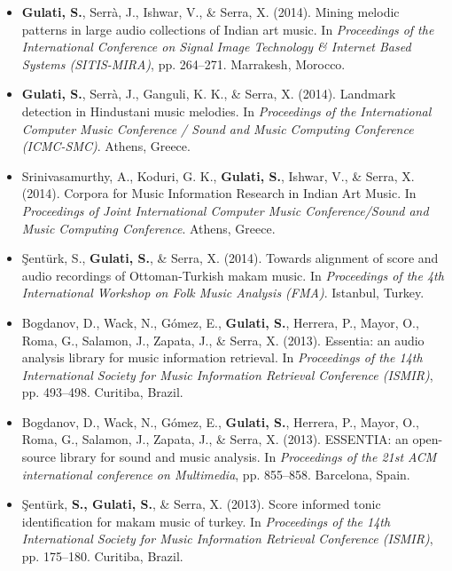 \begin{itemize}[leftmargin=*]
	\item \textbf{Gulati, S.},  Serr{\`a}, J., Ishwar, V., \& Serra, X. (2014). Mining melodic patterns in large audio collections of Indian art music. In \textit{Proceedings of the International Conference on Signal Image Technology \& Internet Based Systems (SITIS-MIRA)}, pp. 264–271. Marrakesh, Morocco.
	\item \textbf{Gulati, S.}, Serr{\`a}, J., Ganguli, K. K., \& Serra, X. (2014). Landmark detection in Hindustani music melodies. In \textit{Proceedings of the International Computer Music Conference / Sound and Music Computing Conference (ICMC-SMC)}. Athens, Greece. 
	\item Srinivasamurthy, A., Koduri, G. K., \textbf{Gulati, S.}, Ishwar, V., \& Serra, X. (2014). Corpora for Music Information Research in Indian Art Music. In \textit{Proceedings of Joint International Computer Music Conference/Sound and Music Computing Conference}. Athens, Greece. 
	\item \c{S}ent{\"u}rk, S., \textbf{Gulati, S.}, \& Serra, X. (2014). Towards alignment of score and audio recordings of Ottoman-Turkish makam music. In \textit{Proceedings of the 4th International Workshop on Folk Music Analysis (FMA)}. Istanbul, Turkey. 
	\item Bogdanov, D., Wack, N., G{\'o}mez, E., \textbf{Gulati, S.}, Herrera, P., Mayor, O., Roma, G., Salamon, J., Zapata, J., \& Serra, X. (2013). Essentia: an audio analysis library for music information retrieval. In \textit{Proceedings of the 14th International Society for Music Information Retrieval Conference (ISMIR)}, pp. 493–498. Curitiba, Brazil.
	\item Bogdanov, D., Wack, N., G{\'o}mez, E., \textbf{Gulati, S.}, Herrera, P., Mayor, O., Roma, G., Salamon, J., Zapata, J., \& Serra, X. (2013). ESSENTIA: an open-source library for sound and music analysis. In \textit{Proceedings of the 21st ACM international conference on Multimedia}, pp. 855–858. Barcelona, Spain.
	\item \c{S}ent{\"u}rk, \textbf{S., Gulati, S.}, \& Serra, X. (2013). Score informed tonic identification for makam music of turkey. In \textit{Proceedings of the 14th International Society for Music Information Retrieval Conference (ISMIR)}, pp. 175–180. Curitiba, Brazil.

\end{itemize}
